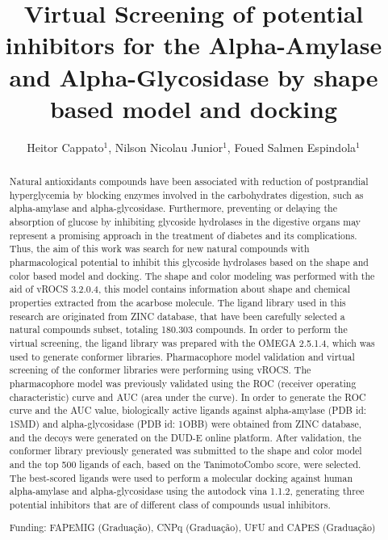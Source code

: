 \documentclass[twoside]{article}
\title{\vspace{-15mm}\fontsize{24pt}{10pt}\selectfont\textbf{Virtual Screening of potential inhibitors for the Alpha-Amylase and Alpha-Glycosidase by shape based model and docking}} %
\author{Heitor Cappato$^1$, Nilson Nicolau Junior$^1$, Foued Salmen Espindola$^1$}
\affil{1 UFU\\ }
\date{}
\begin{document}
\maketitle %

\thispagestyle{fancy} %


\begin{abstract}
Natural antioxidants compounds have been associated with reduction of postprandial hyperglycemia by blocking enzymes involved in the carbohydrates digestion, such as alpha-amylase and alpha-glycosidase. Furthermore, preventing or delaying the absorption of glucose by inhibiting glycoside hydrolases in the digestive organs may represent a promising approach in the treatment of diabetes and its complications. Thus, the aim of this work was search for new natural compounds with pharmacological potential to inhibit this glycoside hydrolases based on the shape and color based model and docking. The shape and color modeling was performed with the aid of vROCS 3.2.0.4, this model contains information about shape and chemical properties extracted from the acarbose molecule. The ligand library used in this research are originated from ZINC database, that have been carefully selected a natural compounds subset, totaling 180.303 compounds. In order to perform the virtual screening, the ligand library was prepared with the OMEGA 2.5.1.4, which was used to generate conformer libraries. Pharmacophore model validation and virtual screening of the conformer libraries were performing using vROCS. The pharmacophore model was previously validated using the ROC (receiver operating characteristic) curve and AUC (area under the curve). In order to generate the ROC curve and the AUC value, biologically active ligands against alpha-amylase (PDB id: 1SMD) and alpha-glycosidase (PDB id: 1OBB) were obtained from ZINC database, and the decoys were generated on the DUD-E online platform. After validation, the conformer library previously generated was submitted to the shape and color model and the top 500 ligands of each, based on the TanimotoCombo score, were selected. The best-scored ligands were used to perform a molecular docking against human alpha-amylase and alpha-glycosidase using the autodock vina 1.1.2, generating three potential inhibitors that are of different class of compounds usual inhibitors.

Funding: FAPEMIG (Gradua\c{c}\~ao), CNPq (Gradua\c{c}\~ao), UFU and CAPES (Gradua\c{c}\~ao)
\end{abstract}
\end{document}
